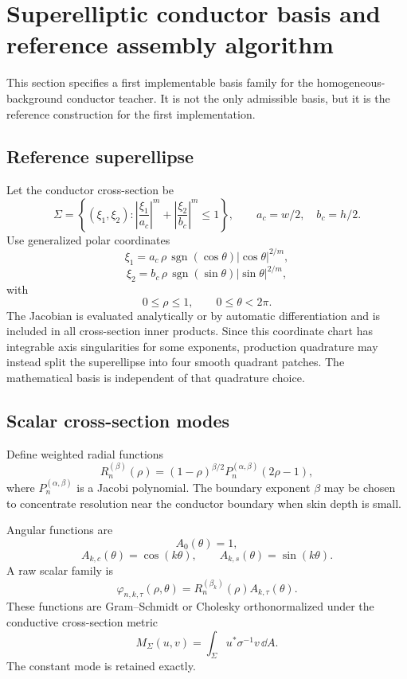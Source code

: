 \section{Superelliptic conductor basis and reference assembly algorithm}
\label{sec:superellipse-basis}

This section specifies a first implementable basis family for the homogeneous-
background conductor teacher. It is not the only admissible basis, but it is
the reference construction for the first implementation.

\subsection{Reference superellipse}

Let the conductor cross-section be
\[
 \Sigma
 =
 \left\{
  (\xi_1,\xi_2):
  \left|\frac{\xi_1}{a_c}\right|^m
  +
  \left|\frac{\xi_2}{b_c}\right|^m
  \le 1
 \right\},
 \qquad
 a_c=w/2,\quad b_c=h/2 .
\]
Use generalized polar coordinates
\[
 \xi_1
 =
 a_c\,\rho\,
 \operatorname{sgn}(\cos\theta)
 |\cos\theta|^{2/m},
\]
\[
 \xi_2
 =
 b_c\,\rho\,
 \operatorname{sgn}(\sin\theta)
 |\sin\theta|^{2/m},
\]
with
\[
 0\le\rho\le1,\qquad 0\le\theta<2\pi.
\]
The Jacobian is evaluated analytically or by automatic differentiation and is
included in all cross-section inner products. Since this coordinate chart has
integrable axis singularities for some exponents, production quadrature may
instead split the superellipse into four smooth quadrant patches. The
mathematical basis is independent of that quadrature choice.

\subsection{Scalar cross-section modes}

Define weighted radial functions
\[
 R_n^{(\beta)}(\rho)
 =
 (1-\rho)^{\beta/2}
 P_n^{(\alpha,\beta)}(2\rho-1),
\]
where $P_n^{(\alpha,\beta)}$ is a Jacobi polynomial. The boundary exponent
$\beta$ may be chosen to concentrate resolution near the conductor boundary
when skin depth is small.

Angular functions are
\[
 A_0(\theta)=1,
\]
\[
 A_{k,c}(\theta)=\cos(k\theta),\qquad
 A_{k,s}(\theta)=\sin(k\theta).
\]
A raw scalar family is
\[
 \varphi_{n,k,\tau}(\rho,\theta)
 =
 R_n^{(\beta_k)}(\rho)A_{k,\tau}(\theta).
\]
These functions are Gram--Schmidt or Cholesky orthonormalized under the
conductive cross-section metric
\[
 M_\Sigma(u,v)
 =
 \int_{\Sigma}u^\ast \sigma^{-1}v\,\dd A .
\]
The constant mode is retained exactly.


